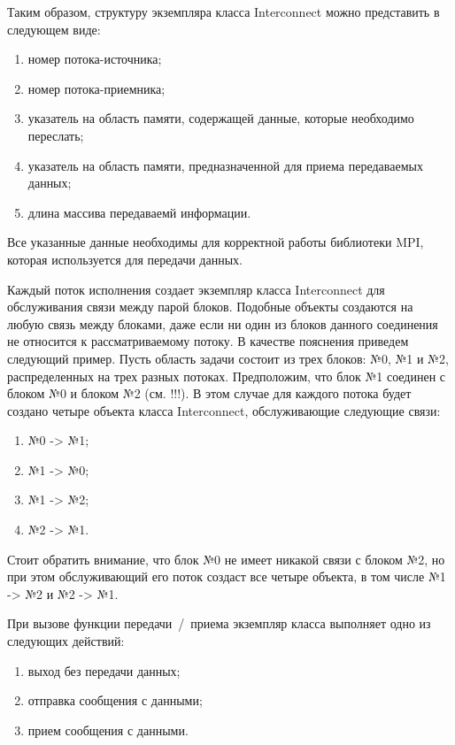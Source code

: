 \documentclass[a4paper, 14pt]{extarticle}
\theoremstyle{definition}
\begin{document}
\par Таким образом, структуру экземпляра класса Interconnect можно представить в следующем виде:
\begin{enumerate}
\item номер потока-источника;
\item номер потока-приемника;
\item указатель на область памяти, содержащей данные, которые необходимо переслать;
\item указатель на область памяти, предназначенной для приема передаваемых данных;
\item длина массива передаваемй информации.
\end{enumerate}

\par Все указанные данные необходимы для корректной работы библиотеки MPI, которая используется для передачи данных.

\par Каждый поток исполнения создает экземпляр класса Interconnect для обслуживания связи между парой блоков. Подобные объекты создаются на любую связь между блоками, даже если ни один из блоков данного соединения не относится к рассматриваемому потоку. В качестве пояснения приведем следующий пример. Пусть область задачи состоит из трех блоков: №0, №1 и №2, распределенных на трех разных потоках. Предположим, что блок №1 соединен с блоком №0 и блоком №2 (см. !!!). В этом случае для каждого потока будет создано четыре объекта класса Interconnect, обслуживающие следующие связи:
\begin{enumerate}
\item №0 -> №1;
\item №1 -> №0;
\item №1 -> №2;
\item №2 -> №1.
\end{enumerate}

\par Стоит обратить внимание, что блок №0 не имеет никакой связи с блоком №2, но при этом обслуживающий его поток создаст все четыре объекта, в том числе №1 -> №2 и №2 -> №1. 

\par При вызове функции передачи~/~приема экземпляр класса выполняет одно из следующих действий:
\begin{enumerate}
\item выход без передачи данных;
\item отправка сообщения с данными;
\item прием сообщения с данными.
\end{enumerate}
\end{document}
